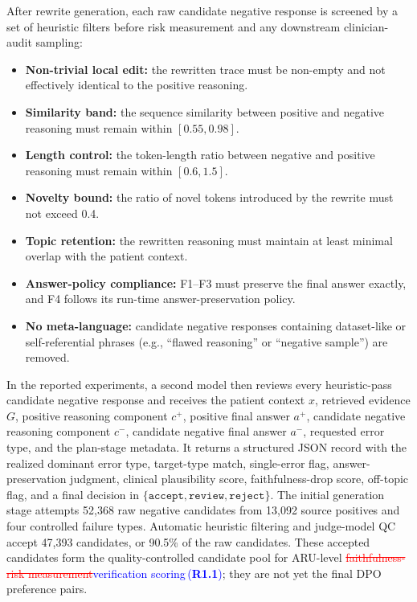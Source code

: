 \documentclass[a4paper,fleqn,doubleblind]{cas-sc}
\DeclareRobustCommand{\deleted}[1]{\textcolor{red}{\sout{#1}}}
\DeclareRobustCommand{\added}[1]{\textcolor{blue}{#1}}
\DeclareRobustCommand{\revtag}[1]{\textcolor{blue}{\scriptsize\,(\textbf{#1})}}
\begin{document}
After rewrite generation, each raw candidate negative response is screened by a set of heuristic filters before risk measurement and any downstream clinician-audit sampling:
\begin{itemize}[leftmargin=*]
    \item \textbf{Non-trivial local edit:} the rewritten trace must be non-empty and not effectively identical to the positive reasoning.
    \item \textbf{Similarity band:} the sequence similarity between positive and negative reasoning must remain within $[0.55, 0.98]$.
    \item \textbf{Length control:} the token-length ratio between negative and positive reasoning must remain within $[0.6, 1.5]$.
    \item \textbf{Novelty bound:} the ratio of novel tokens introduced by the rewrite must not exceed 0.4.
    \item \textbf{Topic retention:} the rewritten reasoning must maintain at least minimal overlap with the patient context.
    \item \textbf{Answer-policy compliance:} F1--F3 must preserve the final answer exactly, and F4 follows its run-time answer-preservation policy.
    \item \textbf{No meta-language:} candidate negative responses containing dataset-like or self-referential phrases (e.g., ``flawed reasoning'' or ``negative sample'') are removed.
\end{itemize}

In the reported experiments, a second model then reviews every heuristic-pass candidate negative response and receives the patient context $x$, retrieved evidence $G$, positive reasoning component $c^{+}$, positive final answer $a^{+}$, candidate negative reasoning component $c^{-}$, candidate negative final answer $a^{-}$, requested error type, and the plan-stage metadata. It returns a structured JSON record with the realized dominant error type, target-type match, single-error flag, answer-preservation judgment, clinical plausibility score, faithfulness-drop score, off-topic flag, and a final decision in $\{\texttt{accept},\texttt{review},\texttt{reject}\}$.
The initial generation stage attempts 52,368 raw negative candidates from 13,092 source positives and four controlled failure types. Automatic heuristic filtering and judge-model QC accept 47,393 candidates, or 90.5\% of the raw candidates. These accepted candidates form the quality-controlled candidate pool for ARU-level \deleted{faithfulness-risk measurement}\added{verification scoring}\revtag{R1.1}; they are not yet the final DPO preference pairs.
\end{document}
